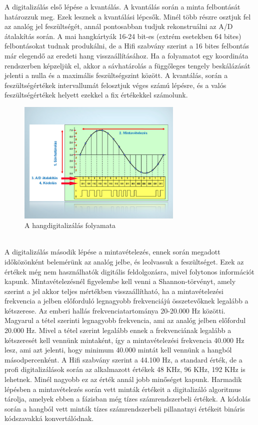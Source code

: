 \documentclass[a4paper,12pt]{paper}
\begin{document}
A digitalizálás első lépése a kvantálás. A kvantálás során a minta felbontását határozzuk meg. Ezek lesznek a kvantálási lépcsők. Minél több részre osztjuk fel az analóg jel feszültségét, annál pontosabban tudjuk rekonstruálni az A/D átalakítás során. A mai hangkártyák 16-24 bit-es (extrém esetekben 64 bites) felbontásokat tudnak produkálni, de a Hifi szabvány szerint a 16 bites felbontás már elegendő az eredeti hang visszaállításához. Ha a folyamatot egy koordináta rendszerben képzeljük el, akkor a sávhatárolás a függőleges tengely beskálázását jelenti a nulla és a maximális feszültségszint között.
A kvantálás, során a feszültségértékek intervallumát felosztjuk véges számú lépésre, és a valós feszültségértékek helyett ezekkel a fix értékekkel számolunk.
\begin{figure}[h]
	\centering
	\includegraphics[width=0.7\textwidth]{folyamat}
	\caption{A hangdigitalizálás folyamata}
\end{figure}
\\A digitalizálás második lépése a mintavételezés, ennek során megadott időközönként belemérünk az analóg jelbe, és leolvassuk a feszültséget. Ezek az értékek még nem használhatók digitális feldolgozásra, mivel folytonos információt kapunk. Mintavételezésnél figyelembe kell venni a Shannon-törvényt, amely szerint a jel akkor teljes mértékben visszaállítható, ha a mintavételezési frekvencia a jelben előforduló legnagyobb frekvenciájú összetevőknek legalább a kétszerese. Az emberi hallás frekvenciatartománya 20-20.000 Hz közötti. Magyarul a tétel szerinti legnagyobb frekvencia, ami az analóg jelben előfordul 20.000 Hz. Mivel a tétel szerint legalább ennek a frekvenciának legalább a kétszeresét kell vennünk mintaként, így a mintavételezési frekvencia 40.000 Hz lesz, ami azt jelenti, hogy minimum 40.000 mintát kell vennünk a hangból másodpercenként. A Hifi szabvány szerint a 44.100 Hz, a standard érték, de a profi digitalizálások során az alkalmazott értékek 48 KHz, 96 KHz, 192 KHz is lehetnek. Minél nagyobb ez az érték annál jobb minőséget kapunk. Harmadik lépésben a mintavételezés során vett minták értékeit a digitalizáló algoritmus tárolja, amelyek ebben a fázisban még tízes számrendszerbeli értékek. A kódolás során a hangból vett minták tízes számrendszerbeli pillanatnyi értékeit bináris kódszavakká konvertálódnak. 
\end{document}
